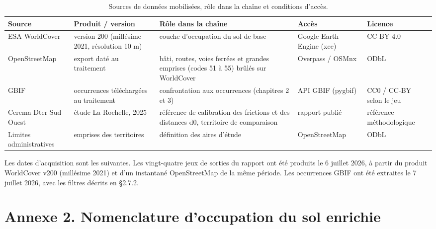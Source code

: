 \documentclass[a4paper,12pt]{report}
\begin{document}
\begin{table}[H]
\centering
\small
\caption{Sources de données mobilisées, rôle dans la chaîne et conditions d'accès.}
\begin{tabularx}{\textwidth}{>{\raggedright\arraybackslash}X >{\raggedright\arraybackslash}X >{\raggedright\arraybackslash}X >{\raggedright\arraybackslash}X >{\raggedright\arraybackslash}X}
\toprule
\textbf{Source} & \textbf{Produit / version} & \textbf{Rôle dans la chaîne} & \textbf{Accès} & \textbf{Licence} \\
\midrule
ESA WorldCover & version 200 (millésime 2021, résolution 10 m) & couche d'occupation du sol de base & Google Earth Engine (xee) & CC-BY 4.0 \\
OpenStreetMap & export daté au traitement & bâti, routes, voies ferrées et grandes emprises (codes 51 à 55) brûlés sur WorldCover & Overpass / OSMnx & ODbL \\
GBIF & occurrences téléchargées au traitement & confrontation aux occurrences (chapitres 2 et 3) & API GBIF (pygbif) & CC0 / CC-BY selon le jeu \\
Cerema Dter Sud-Ouest & étude La Rochelle, 2025 & référence de calibration des frictions et des distances d0, territoire de comparaison & rapport publié & référence méthodologique \\
Limites administratives & emprises des territoires & définition des aires d'étude & OpenStreetMap & ODbL \\
\bottomrule
\end{tabularx}
\end{table}

Les dates d'acquisition sont les suivantes. Les vingt-quatre jeux de sorties du rapport ont été produits le 6 juillet 2026, à partir du produit WorldCover v200 (millésime 2021) et d'un instantané OpenStreetMap de la même période. Les occurrences GBIF ont été extraites le 7 juillet 2026, avec les filtres décrits en §2.7.2.

\section*{Annexe 2. Nomenclature d'occupation du sol enrichie}
{}
\end{document}
